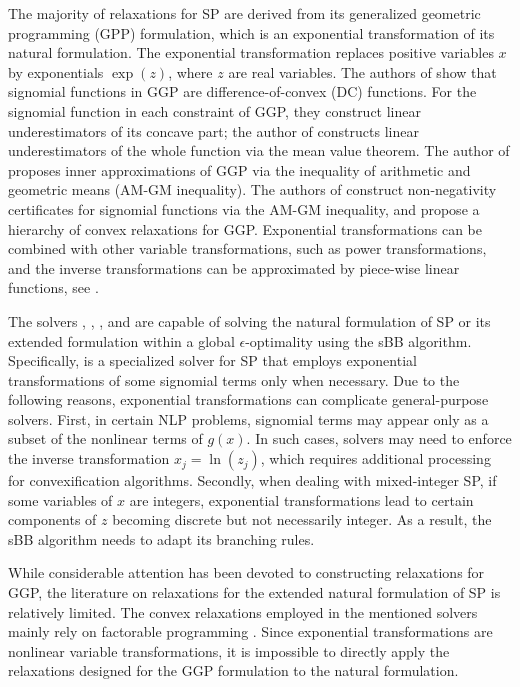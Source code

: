 The majority of relaxations for SP are derived from its generalized geometric programming (GPP) formulation,  which is an exponential transformation \cite{duffin1970linearizing}  of its natural formulation. The exponential transformation replaces positive variables $x$ by exponentials $\exp(z)$, where $z$ are real variables. The authors of  \cite{maranas1997global} show that signomial functions in GGP are difference-of-convex (DC) functions. For the signomial function in each constraint of GGP, they  construct linear underestimators of its concave part; the author  of \cite{shen2005linearization} constructs linear underestimators of the whole function via the mean value theorem. The author of \cite{xu2014global} proposes inner approximations  of GGP via the inequality of  arithmetic and geometric means (AM-GM inequality). The authors of \cite{chandrasekaran2016,dressler2022algebraic,murray2021signomial} construct  non-negativity certificates for signomial functions via the AM-GM inequality, and propose a hierarchy of convex relaxations for GGP. Exponential transformations can be combined with other variable transformations, such as  power transformations, and the inverse transformations can be approximated by piece-wise linear functions, see \cite{lin2012range,lundell2013reformulation,lundell2018}.

The solvers \scip \cite{bestuzheva2023global}, \baron \cite{tawarmalani2005polyhedral}, \antigone \cite{Misener2014}, and \miso \cite{misener2012global,Misener2014miso} are capable of solving the natural formulation of SP or its extended formulation within a global $\epsilon$-optimality using the sBB algorithm. Specifically, \miso is a specialized solver for SP that employs exponential transformations of some signomial terms only when necessary.  Due to the following reasons, exponential transformations can complicate general-purpose solvers. First, in certain NLP problems, signomial terms may appear only as a subset of the nonlinear terms of $g(x)$. In such cases, solvers may need to enforce the inverse transformation $x_j = \ln(z_j)$, which requires additional processing for convexification algorithms. Secondly, when dealing with mixed-integer SP, if some variables of $x$ are integers, exponential transformations lead to certain components of $z$ becoming discrete but not necessarily integer. As a result, the sBB algorithm needs to adapt its branching rules.

While considerable attention has been devoted to constructing relaxations for GGP, the literature on relaxations for the extended natural formulation of SP is relatively limited. The convex relaxations employed in the mentioned solvers mainly rely on factorable programming \cite{leonelson, mccormick1976computability}. Since exponential transformations are nonlinear variable transformations, it is impossible to directly apply the relaxations designed for the GGP formulation to the natural formulation.

